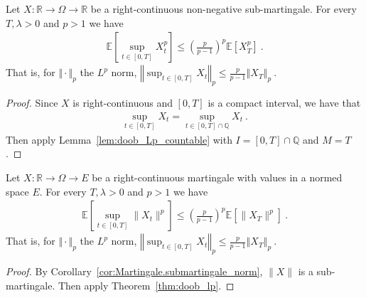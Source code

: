 







\begin{theorem}\label{thm:doob_lp}
  Let $X:\mathbb{R} \rightarrow \Omega \rightarrow \mathbb{R}$ be a right-continuous non-negative sub-martingale.
  For every $T, \lambda>0$ and $p>1$ we have
  \begin{align*}
    \mathbb{E}\left[ \sup_{t\in[0,T]}X_t^p \right]
    \leq \left(\frac{p}{p-1}\right)^p\mathbb{E}[X_T^p]
    \: .
  \end{align*}
  That is, for $\Vert \cdot \Vert_p$ the $L^p$ norm,
  $\left\Vert \sup_{t\in[0,T]}  X_t  \right\Vert_p
    \leq \frac{p}{p-1} \left\Vert X_T \right\Vert_p
    \: .$
\end{theorem}

\begin{proof}
Since $X$ is right-continuous and $[0,T]$ is a compact interval, we have that
\begin{align*}
  \sup_{t\in[0,T]}X_t = \sup_{t\in[0,T] \cap \mathbb{Q}}X_t
  \: .
\end{align*}
Then apply Lemma~\ref{lem:doob_Lp_countable} with $I = [0,T] \cap \mathbb{Q}$ and $M = T$.
\end{proof}


\begin{corollary}\label{cor:doob_lp_norm}
  Let $X : \mathbb{R} \rightarrow \Omega\rightarrow E$ be a right-continuous martingale with values in a normed space $E$.
  For every $T, \lambda>0$ and $p>1$ we have
  \begin{align*}
    \mathbb{E}\left[ \sup_{t\in[0,T]} \lVert X_t \rVert ^ p \right]
    \leq \left(\frac{p}{p-1}\right)^p\mathbb{E}[\lVert X_T \rVert ^p]
    \: .
  \end{align*}
  That is, for $\Vert \cdot \Vert_p$ the $L^p$ norm,
  $\left\Vert \sup_{t\in[0,T]}  X_t  \right\Vert_p
    \leq \frac{p}{p-1} \left\Vert X_T \right\Vert_p
    \: .$
\end{corollary}

\begin{proof}
  By Corollary~\ref{cor:Martingale.submartingale_norm}, $\lVert X \rVert$ is a sub-martingale.
  Then apply Theorem~\ref{thm:doob_lp}.
\end{proof}


